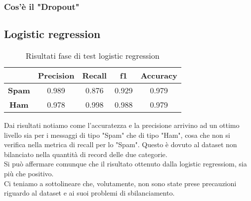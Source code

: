 \subsubsection{Cos'è il "Dropout"}
\subsection{Logistic regression}
\renewcommand{\arraystretch}{1.4}
\begin{table}[H]
	\begin{center}
		\begin{tabular}{|c|c|c|c|c|}
			\hline
			&\textbf{Precision} & \textbf{Recall} & \textbf{f1} & \textbf{Accuracy}\\ \hline
			\textbf{Spam} & 0.989  & 0.876 & 0.929 & 0.979 \\ \hline
			\textbf{Ham} & 0.978  & 0.998 & 0.988 & 0.979\\ \hline
		\end{tabular}
		\caption{Risultati fase di test logistic regression\label{}}
	\end{center}
\end{table}
\renewcommand{\arraystretch}{1}
Dai risultati notiamo come l'accuratezza e la precisione arrivino ad un ottimo livello sia per i messaggi di tipo "Spam" che di tipo "Ham", cosa che non si verifica nella metrica di recall per lo "Spam". Questo è dovuto al dataset non bilanciato nella quantità di record delle due categorie. \\
Si può affermare comunque che il risultato ottenuto dalla logistic regressiom, sia più che positivo.\\
Ci teniamo a sottolineare che, volutamente, non sono state prese precauzioni riguardo al dataset e ai suoi problemi di sbilanciamento.